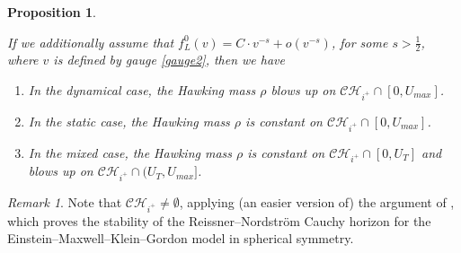 \documentclass[10pt,a4paper]{article}
\theoremstyle{plain}
\newtheorem{prop}[thm]{Proposition}
\theoremstyle{remark}
\newtheorem{rmk}{Remark}[section]
\theoremstyle{definition}
\theoremstyle{plain}
\theoremstyle{remark}
\theoremstyle{definition}
\newcommand{\CH}{\mathcal{CH}_{i^+}}
\numberwithin{equation}{section}
\begin{document}
\begin{prop}
\begin{enumerate}[a]
	\end{enumerate} If we additionally assume that $f_L^0(v)=C \cdot v^{-s}+o(v^{-s})$, for some $s>\frac{1}{2}$, where $v$ is defined by gauge \eqref{gauge2}, then we have \begin{enumerate}[a]
	\item In the dynamical case, the Hawking mass $\rho$ blows up on $\CH \cap [0,U_{max}] $.
	\item In the static case, the Hawking mass $\rho$ is constant %
	on $\CH \cap [0,U_{max}] $.
	\item  In the mixed case, the Hawking mass $\rho$ is constant on $\CH \cap [0,U_{T}] $ and blows up on $\CH \cap (U_T,U_{max}]$.
\end{enumerate}
\end{prop}
\begin{rmk}
	Note that $\CH \neq \emptyset$, applying (an easier version of) the argument of \cite{Moi}, which proves the stability of the Reissner--Nordstr\"{o}m Cauchy horizon for the Einstein--Maxwell--Klein--Gordon model in spherical symmetry.
\end{rmk}
\end{document}
